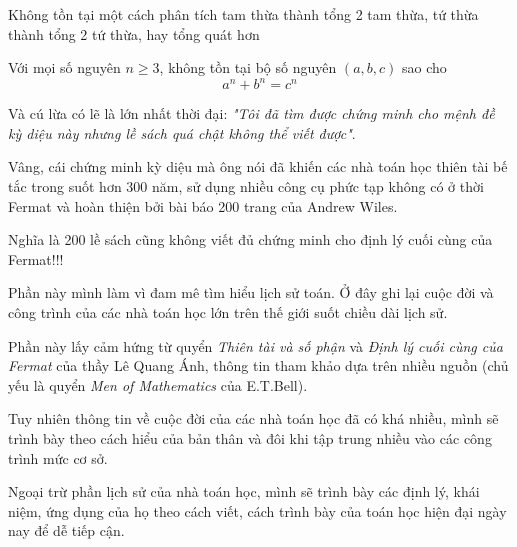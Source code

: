 \begin{theorem}
    Không tồn tại một cách phân tích tam thừa thành tổng 2 tam thừa, tứ thừa thành tổng 2 tứ thừa, hay tổng quát hơn

    Với mọi số nguyên $n \geq 3$, không tồn tại bộ số nguyên $(a, b, c)$ sao cho
    \[a^n + b^n = c^n\]
\end{theorem}

Và cú lừa có lẽ là lớn nhất thời đại: \textit{"Tôi đã tìm được chứng minh cho mệnh đề kỳ diệu này nhưng lề sách quá chật không thể viết được"}.

Vâng, cái chứng minh kỳ diệu mà ông nói đã khiến các nhà toán học thiên tài bế tắc trong suốt hơn 300 năm, sử dụng nhiều công cụ phức tạp không có ở thời Fermat và hoàn thiện bởi bài báo 200 trang của Andrew Wiles.

Nghĩa là 200 lề sách cũng không viết đủ chứng minh cho định lý cuối cùng của Fermat!!!

Phần này mình làm vì đam mê tìm hiểu lịch sử toán. Ở đây ghi lại cuộc đời và công trình của các nhà toán học lớn trên thế giới suốt chiều dài lịch sử.

Phần này lấy cảm hứng từ quyển \textit{Thiên tài và số phận} và \textit{Định lý cuối cùng của Fermat} của thầy Lê Quang Ánh, thông tin tham khảo dựa trên nhiều nguồn (chủ yếu là quyển \textit{Men of Mathematics} của E.T.Bell).

Tuy nhiên thông tin về cuộc đời của các nhà toán học đã có khá nhiều, mình sẽ trình bày theo cách hiểu của bản thân và đôi khi tập trung nhiều vào các công trình mức cơ sở.

Ngoại trừ phần lịch sử của nhà toán học, mình sẽ trình bày các định lý, khái niệm, ứng dụng của họ theo cách viết, cách trình bày của toán học hiện đại ngày nay để dễ tiếp cận.